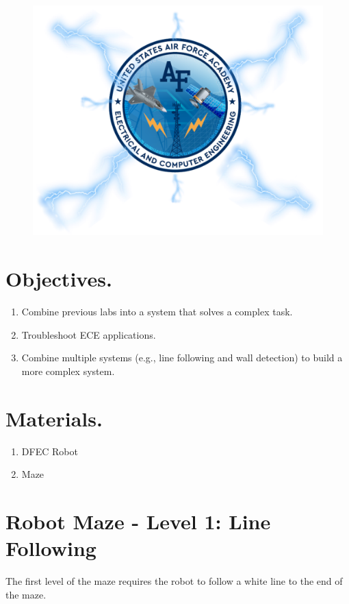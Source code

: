 \documentclass{handout}
\begin{document}
	\maketitle
	\begin{figure}[H]
		\centering
		\includegraphics[width=.75\textwidth]{Cover.PNG}
	\end{figure}
	
	\section{Objectives.} 
	\begin{enumerate}
		\item Combine previous labs into a system that solves a complex task. 
		\item Troubleshoot ECE applications.
		\item Combine multiple systems (e.g., line following and wall detection) to build a more complex system.
	\end{enumerate}
	
	\section{Materials.}
	\begin{enumerate}
		\item DFEC Robot
		\item Maze
	\end{enumerate}
	
	\section{Robot Maze - Level 1: Line Following}
	The first level of the maze requires the robot to follow a white line to the end of the maze.
	
\end{document}
